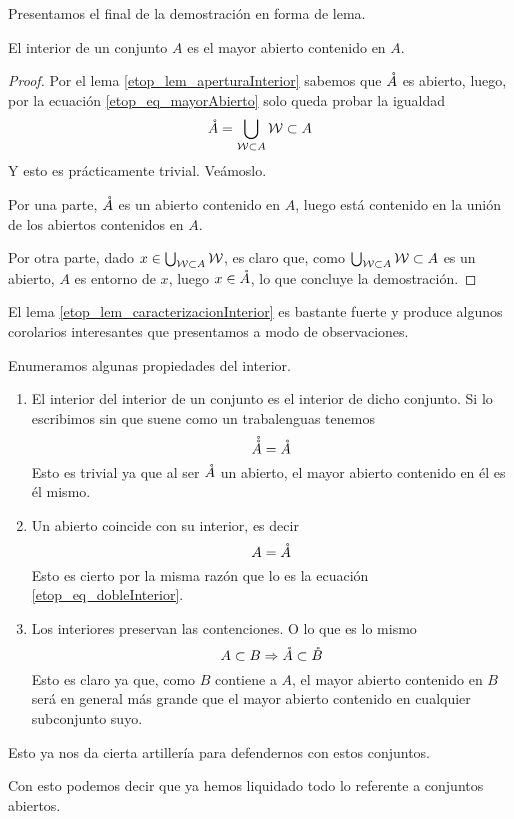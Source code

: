 Presentamos el final de la demostración en forma de lema.
\begin{lem}
	\label{etop_lem_caracterizacionInterior}
	El interior de un conjunto $A$ es el mayor abierto contenido en $A$.
\end{lem}
\begin{proof}
	Por el lema \ref{etop_lem_aperturaInterior} sabemos que $\mathring{A}$ es abierto, luego, por la ecuación \eqref{etop_eq_mayorAbierto} solo queda probar la igualdad
	\begin{equation*}
	\mathring{A}=\bigcup_{\mathcal{W}\subset A}\mathcal{W}\subset A
	\end{equation*}
	Y esto es prácticamente trivial. Veámoslo.
	
	Por una parte, $\mathring{A}$ es un abierto contenido en $A$, luego está contenido en la unión de los abiertos contenidos en $A$.
	
	Por otra parte, dado $x\in\bigcup_{\mathcal{W}\subset A}\mathcal{W}$, es claro que, como $\bigcup_{\mathcal{W}\subset A}\mathcal{W}\subset A$ es un abierto, $A$ es entorno de $x$, luego $x\in\mathring{A}$, lo que concluye la demostración.
\end{proof}

El lema \ref{etop_lem_caracterizacionInterior} es bastante fuerte y produce algunos corolarios interesantes que presentamos a modo de observaciones.
\begin{obs}
	\label{etop_obs_propiedadesInterior}
	Enumeramos algunas propiedades del interior.
	\begin{enumerate}
		\item El interior del interior de un conjunto es el interior de dicho conjunto. Si lo escribimos sin que suene como un trabalenguas tenemos
		\begin{equation}
		\label{etop_eq_dobleInterior}
		\mathring{\mathring{A}}=\mathring{A}
		\end{equation}
		Esto es trivial ya que al ser $\mathring{A}$ un abierto, el mayor abierto contenido en él es él mismo.
		\item Un abierto coincide con su interior, es decir
		\begin{equation}
		\label{etop_eq_abiertoInterior}
		A=\mathring{A}
		\end{equation}
		Esto es cierto por la misma razón que lo es la ecuación \eqref{etop_eq_dobleInterior}.
		\item Los interiores preservan las contenciones. O lo que es lo mismo
		\begin{equation}
		\label{etop_eq_interiorContencion}
		A\subset B\Rightarrow \mathring{A}\subset\mathring{B}
		\end{equation}
		Esto es claro ya que, como $B$ contiene a $A$, el mayor abierto contenido en $B$ será en general más grande que el mayor abierto contenido en cualquier subconjunto suyo.
	\end{enumerate}
	Esto ya nos da cierta artillería para defendernos con estos conjuntos.
\end{obs}
Con esto podemos decir que ya hemos liquidado todo lo referente a conjuntos abiertos.
